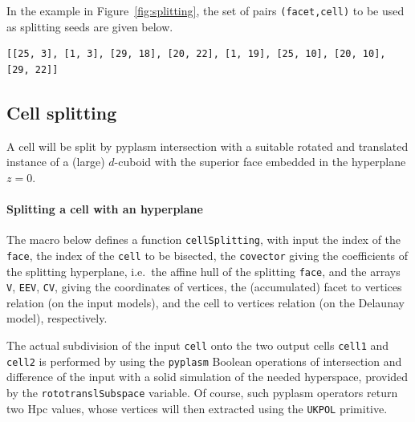 \documentclass[11pt,oneside]{article}	%
\begin{document}
In the example in Figure~\ref{fig:splitting}, the set of pairs \texttt{(facet,cell)} to be used as splitting seeds are given below.
{\small
\begin{verbatim}
[[25, 3], [1, 3], [29, 18], [20, 22], [1, 19], [25, 10], [20, 10], [29, 22]]
\end{verbatim}}

\subsection{Cell splitting}

A cell will be split by pyplasm intersection with a suitable rotated and translated instance of a (large) $d$-cuboid with the superior face embedded in the hyperplane $z=0$.

\paragraph{Splitting a cell with an hyperplane}
The macro below defines a function \texttt{cellSplitting}, with input the index of the \texttt{face}, the index of the \texttt{cell} to be bisected, the \texttt{covector} giving the coefficients of the splitting hyperplane, i.e.~the affine hull of the splitting \texttt{face}, and the arrays \texttt{V}, \texttt{EEV}, \texttt{CV}, giving the coordinates of vertices, the (accumulated) facet to vertices relation (on the input models), and the cell to vertices relation (on the Delaunay model), respectively. 

The actual subdivision of the input \texttt{cell} onto the two output cells \texttt{cell1} and \texttt{cell2} is performed by using the \texttt{pyplasm} Boolean operations of intersection and difference of the input with a solid simulation of the needed hyperspace, provided by the \texttt{rototranslSubspace} variable. Of course, such pyplasm operators return two Hpc values, whose vertices will then extracted using the \texttt{UKPOL} primitive.
\end{document}
